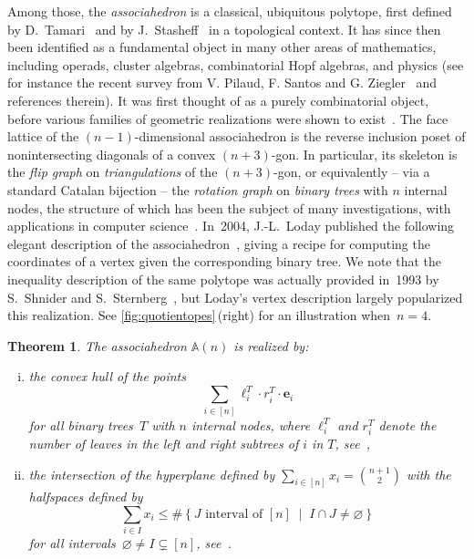 \documentclass{amsart}
\newtheorem{theorem}{Theorem}%
\theoremstyle{definition}
\newcommand{\R}{\mathbb{R}} %
\renewcommand{\b}[1]{{\boldsymbol{#1}}} %
\newcommand{\set}[2]{\left\{ #1 \;\middle|\; #2 \right\}} %
\newcommand{\darkblue}{\color{darkblue}} %
\newcommand{\defn}[1]{\textsl{\darkblue #1}} %
\newcommand{\polytope}[1]{\mathds{#1}} %
\newcommand{\Asso}{\polytope{A}} %
\begin{document}
Among those, the \defn{associahedron} is a classical, ubiquitous polytope, first defined by D.~Tamari~\cite{T51} and by J.~Stasheff~\cite{S63} in a topological context.
It has since then been identified as a fundamental object in many other areas of mathematics, including operads, cluster algebras, combinatorial Hopf algebras, and physics (see for instance the recent survey from V. Pilaud, F. Santos and G. Ziegler~\cite{PilaudSantosZiegler} and references therein).
It was first thought of as a purely combinatorial object, before various families of geometric realizations were shown to exist~\cite{MR1022776,MR1941227,MR2108555,MR3437894,MR2321739}.
The face lattice of the $(n-1)$-dimensional associahedron is the reverse inclusion poset of nonintersecting diagonals of a convex $(n+3)$-gon.
In particular, its skeleton is the \defn{flip graph} on \defn{triangulations} of the $(n+3)$-gon, or equivalently -- via a standard Catalan bijection -- the \defn{rotation graph} on \defn{binary trees} with $n$ internal nodes, the structure of which has been the subject of many investigations, with applications in computer science~\cite{MR928904,MR3197650}.
In~2004, J.-L.~Loday published the following elegant description of the associahedron~\cite{MR2108555}, giving a recipe for computing the coordinates of a vertex given the corresponding binary tree.
We note that the inequality description of the same polytope was actually provided in~1993 by S.~Shnider and S.~Sternberg~\cite{ShniderSternberg}, but Loday's vertex description largely popularized this realization.
See \cref{fig:quotientopes}\,(right) for an illustration when~$n = 4$.

\begin{theorem}
  \label{thm:loday}
    The associahedron $\Asso (n)$ is realized by:
  \begin{enumerate}[(i)]
  \item the convex hull of the points
    \[
    \sum_{i\in [n]} \ell^T_i\cdot r^T_i \cdot \b{e}_i
    \]
    for all binary trees~$T$ with $n$ internal nodes, where $\ell^T_i$ and $r^T_i$ denote the number of leaves in the left and right subtrees of $i$ in $T$, see~\cite{MR2108555},
  \item the intersection of the hyperplane defined by $\sum_{i \in [n]} x_i = \binom{n+1}{2}$ with the halfspaces defined by
    \[
    \sum_{i \in I} x_i \le \#\set{J \text{ interval of } [n]}{I \cap J \ne \varnothing}
    \]
    for all intervals~$\varnothing \ne I \subsetneq [n]$, see~\cite{ShniderSternberg}.
  \end{enumerate}
\end{theorem}
\end{document}
